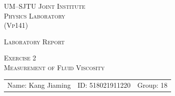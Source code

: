 \documentclass[a4paper]{article}
\begin{document}
\vspace*{0.4cm}

\hrulefill %

\thispagestyle{empty} %

\begin{center}
\begin{large}
\scshape{UM--SJTU Joint Institute \vspace{0.3em} \\ Physics Laboratory \\(Vp141)}
\end{large}

\hrulefill %

\vspace*{6cm}
\begin{Large}
\scshape{{Laboratory Report}}
\end{Large}

\vspace{2em}

\begin{large}
\scshape{Exercise 2}\\
\vspace{0.5em}
\scshape{Measurement of Fluid Viscosity}
\end{large}
\end{center}
\vfill %


\begin{table}[htbp] %
\begin{center}
\begin{tabular}{lll}
Name: Kang Jiaming \hspace*{3em} & ID: 518021911220 \hspace*{3em} & Group: 18\\
\end{tabular}
\end{center}
\end{table}


\hfill %
\newpage
\tableofcontents
\setcounter{page}{0} %
\thispagestyle{empty}
\newpage
\end{document}
